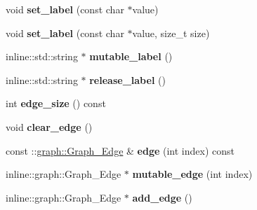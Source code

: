 \begin{DoxyCompactItemize}
\item 
\hypertarget{classgraph_1_1Graph__Node_a15d313094babc84b96727fc0f3c1d8ec}{
void {\bfseries set\_\-label} (const char $\ast$value)}
\label{classgraph_1_1Graph__Node_a15d313094babc84b96727fc0f3c1d8ec}

\item 
\hypertarget{classgraph_1_1Graph__Node_a1919f6fa3da8bfd42a347bf6600ce8b8}{
void {\bfseries set\_\-label} (const char $\ast$value, size\_\-t size)}
\label{classgraph_1_1Graph__Node_a1919f6fa3da8bfd42a347bf6600ce8b8}

\item 
\hypertarget{classgraph_1_1Graph__Node_a64ce191c10f7be3108cfe4de3734a24e}{
inline::std::string $\ast$ {\bfseries mutable\_\-label} ()}
\label{classgraph_1_1Graph__Node_a64ce191c10f7be3108cfe4de3734a24e}

\item 
\hypertarget{classgraph_1_1Graph__Node_a6182277dadee1694a4f934a62b37a0f6}{
inline::std::string $\ast$ {\bfseries release\_\-label} ()}
\label{classgraph_1_1Graph__Node_a6182277dadee1694a4f934a62b37a0f6}

\item 
\hypertarget{classgraph_1_1Graph__Node_aa33c2e20c45055a5f5c64fde8f475b12}{
int {\bfseries edge\_\-size} () const }
\label{classgraph_1_1Graph__Node_aa33c2e20c45055a5f5c64fde8f475b12}

\item 
\hypertarget{classgraph_1_1Graph__Node_a71d1bf9742cb25c8c902a1e04f9c5117}{
void {\bfseries clear\_\-edge} ()}
\label{classgraph_1_1Graph__Node_a71d1bf9742cb25c8c902a1e04f9c5117}

\item 
\hypertarget{classgraph_1_1Graph__Node_affb8668609150e1076fc749edff09ad9}{
const ::\hyperlink{classgraph_1_1Graph__Edge}{graph::Graph\_\-Edge} \& {\bfseries edge} (int index) const }
\label{classgraph_1_1Graph__Node_affb8668609150e1076fc749edff09ad9}

\item 
\hypertarget{classgraph_1_1Graph__Node_a9fa2877552b88627c05bd22d418ecd33}{
inline::graph::Graph\_\-Edge $\ast$ {\bfseries mutable\_\-edge} (int index)}
\label{classgraph_1_1Graph__Node_a9fa2877552b88627c05bd22d418ecd33}

\item 
\hypertarget{classgraph_1_1Graph__Node_ac7df0608e84959110b7a40b099012416}{
inline::graph::Graph\_\-Edge $\ast$ {\bfseries add\_\-edge} ()}
\label{classgraph_1_1Graph__Node_ac7df0608e84959110b7a40b099012416}


\end{DoxyCompactItemize}
